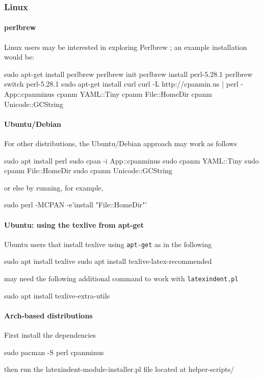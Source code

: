 	\subsubsection{Linux}
		\paragraph{perlbrew}
			Linux users may be interested in exploring Perlbrew \cite{perlbrew}; an example
			installation would be:
			\begin{commandshell}
sudo apt-get install perlbrew
perlbrew init
perlbrew install perl-5.28.1
perlbrew switch perl-5.28.1
sudo apt-get install curl
curl -L http://cpanmin.us | perl - App::cpanminus
cpanm YAML::Tiny
cpanm File::HomeDir
cpanm Unicode::GCString
\end{commandshell}

		\paragraph{Ubuntu/Debian}
			For other distributions, the Ubuntu/Debian approach may work as follows
			\begin{commandshell}
sudo apt install perl
sudo cpan -i App::cpanminus
sudo cpanm YAML::Tiny
sudo cpanm File::HomeDir
sudo cpanm Unicode::GCString
\end{commandshell}
			or else by running, for example,
			\begin{commandshell}
sudo perl -MCPAN -e'install "File::HomeDir"'
\end{commandshell}

		\paragraph{Ubuntu: using the texlive from apt-get}
			Ubuntu users that install texlive using \texttt{apt-get} as in the following
			\begin{commandshell}
sudo apt install texlive
sudo apt install texlive-latex-recommended
\end{commandshell}
			may need the following additional command to work with \texttt{latexindent.pl}
			\begin{commandshell}
sudo apt install texlive-extra-utils 
\end{commandshell}
		\paragraph{Arch-based distributions}
			First install the dependencies
			\begin{commandshell}
sudo pacman -S perl cpanminus
\end{commandshell}
			then run the latexindent-module-installer.pl file located at helper-scripts/
		
